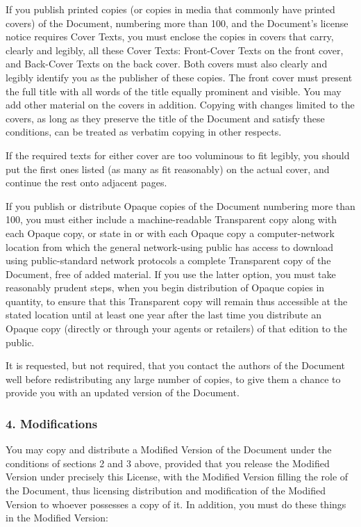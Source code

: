 \documentclass[a4paper,openany]{book}
\begin{document}
\begin{results}
If you publish printed copies (or copies in media that commonly have
printed covers) of the Document, numbering more than 100, and the
Document's license notice requires Cover Texts, you must enclose the
copies in covers that carry, clearly and legibly, all these Cover
Texts: Front-Cover Texts on the front cover, and Back-Cover Texts on
the back cover. Both covers must also clearly and legibly identify
you as the publisher of these copies. The front cover must present
the full title with all words of the title equally prominent and
visible. You may add other material on the covers in addition.
Copying with changes limited to the covers, as long as they preserve
the title of the Document and satisfy these conditions, can be treated
as verbatim copying in other respects.

If the required texts for either cover are too voluminous to fit
legibly, you should put the first ones listed (as many as fit
reasonably) on the actual cover, and continue the rest onto adjacent
pages.

If you publish or distribute Opaque copies of the Document numbering
more than 100, you must either include a machine-readable Transparent
copy along with each Opaque copy, or state in or with each Opaque copy
a computer-network location from which the general network-using
public has access to download using public-standard network protocols
a complete Transparent copy of the Document, free of added material.
If you use the latter option, you must take reasonably prudent steps,
when you begin distribution of Opaque copies in quantity, to ensure
that this Transparent copy will remain thus accessible at the stated
location until at least one year after the last time you distribute an
Opaque copy (directly or through your agents or retailers) of that
edition to the public.

It is requested, but not required, that you contact the authors of the
Document well before redistributing any large number of copies, to give
them a chance to provide you with an updated version of the Document.

\subsubsection*{4. Modifications}

You may copy and distribute a Modified Version of the Document under
the conditions of sections 2 and 3 above, provided that you release
the Modified Version under precisely this License, with the Modified
Version filling the role of the Document, thus licensing distribution
and modification of the Modified Version to whoever possesses a copy
of it. In addition, you must do these things in the Modified Version:


\end{results}
\end{document}
